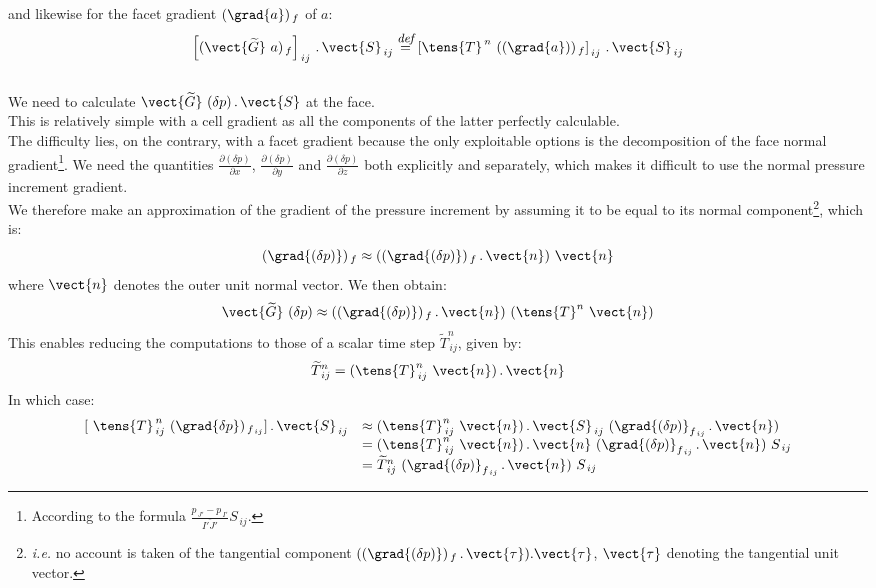 and likewise for the facet gradient $(\grad{a})_{\,f}$ of $a$:
$$ \left[(\vect{\widetilde{G}}\ a )_{\,f}\right]_{\,ij}\,.\,\vect{S}_{\,ij} \overset{\text{\it\small def}}{=} \left[\tens{T}^{\,n}\ ((\grad{a}))_{\,f}\right]_{\,ij}\,.\,\vect{S}_{\,ij} $$
\\

We need to calculate $\vect{\widetilde{G}}\ (\delta p)\,.\,\vect{S}$ at the face.\\
This is relatively simple with a cell gradient as all the components of the latter perfectly calculable.\\
The difficulty lies, on the contrary, with a facet gradient because the only exploitable options is the decomposition of the face normal gradient\footnote{According to the formula $ \displaystyle\frac { p_{\,J'} - p_{\,I'}}{\overline{I'J'}} S_{\,ij}$.}. We need the quantities $\displaystyle \frac{\partial (\delta p)}{\partial x}$, $\displaystyle \frac{\partial (\delta p)}{\partial y}$ and $\displaystyle \frac{\partial (\delta p)}{\partial z}$ both explicitly and separately, which makes it difficult to use the normal pressure increment gradient.\\
We therefore make an approximation of the gradient of the pressure increment by assuming it to be equal to its normal component\footnote{{\it i.e.} no account is taken of the tangential component $((\grad{(\delta p)})_{\,f}\,.\,\vect{\tau}).\vect{\tau}$, $\vect{\tau}$ denoting the tangential unit vector.}, which is:
\begin{equation}
(\grad{(\delta p)})_{\,f} \approx ((\grad{(\delta p)})_{\,f}\,.\,\vect{n})\ \vect{n}
\end{equation}
where $\vect{n}$ denotes the outer unit normal vector.
We then obtain:
$$ \vect{\widetilde{G}}\ (\delta p) \approx ((\grad{(\delta p)})_{\,f}\,.\,\vect{n})\ (\tens{T}^n\ \vect{n})$$
This enables reducing the computations to those of a scalar time step $\widetilde{T}^n_{\,ij}$, given by:
\begin{equation}
\widetilde{T}^n_{\,ij} = (\tens{T}^n_{\,ij}\ \vect{n})\,.\,\vect{n}
\label{Base_Resopv_approx2}
\end{equation}
In which case:
\begin{equation}
\begin{array} {lll}
[\ \tens{T}^{\,n}_{\,ij}\ (\grad{\delta p})_{\,f_{\,ij}}]\,.\,\vect{S}_{\,ij}& \approx (\tens{T}^n_{\,ij}\ \vect{n})\,.\,\vect{S}_{\,ij}\ (\grad{(\delta p)}_{f_{\,ij}}\,.\,\vect{n}) \\
 & =  (\tens{T}^n_{\,ij}\ \vect{n})\,.\,\vect{n} \ ({\grad{(\delta p)}}_{f_{\,ij}}\,.\,\vect{n}) \ S_{\,ij} \\
 & =  \widetilde{T}^n_{\,ij} \ ({\grad{(\delta p)}}_{f_{\,ij}}\,.\,\vect{n}) \ S_{\,ij}
 \end{array}
\label{Base_Resopv_approximation}
\end{equation}
